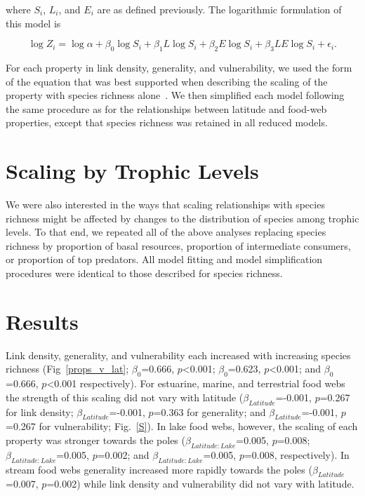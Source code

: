 \documentclass[12pt]{article}
\begin{document}
\begin{spacing}{1.0}
    \noindent where $S_{i}$, $L_{i}$, and $E_{i}$ are as defined previously. The logarithmic formulation of this model is

    \begin{equation}
    \label{LogLat}
    \log{Z_{i}} = \log{\alpha}+\beta_{0}\log{S_{i}} + \beta_{1}L\log{S_{i}} +\beta_{2}E\log{S_{i}} +\beta_{3}LE\log{S_{i}} +\epsilon_{i} .
    \end{equation}

    For each property in link density, generality, and vulnerability, we used the form of the equation that was best supported
    when describing the scaling of the property with species richness alone~\citep{Xiao2011}.
    We then simplified each model following the same procedure as for the relationships between
    latitude and food-web properties, except that species richness was retained in all reduced models. 


  \section*{Scaling by Trophic Levels}

    We were also interested in the ways that scaling relationships with species richness might
    be affected by changes to the distribution of species among trophic levels. To
    that end, we repeated all of the above analyses replacing species richness by
    proportion of basal resources, proportion of intermediate consumers,
    or proportion of top predators. All model fitting and model
    simplification procedures were identical to those described for species
    richness.


\section*{Results}

  Link density, generality, and vulnerability each increased with increasing
  species richness (Fig~\ref{props_v_lat}; $\beta_0$=0.666,
  $p$\textless0.001; $\beta_0$=0.623, $p$\textless0.001; and
  $\beta_0$=0.666, $p$\textless0.001 respectively).  For estuarine, marine,
  and terrestrial food webs the strength of this scaling did not vary with
  latitude ($\beta_{Latitude}$=-0.001, $p$=0.267 for link density;
  $\beta_{Latitude}$=-0.001, $p$=0.363 for generality; and
  $\beta_{Latitude}$=-0.001, $p$=0.267 for vulnerability; Fig.~\ref{S}). In
  lake food webs, however, the scaling of each property was stronger towards
  the poles ($\beta_{Latitude:Lake}$=0.005, $p$=0.008;
  $\beta_{Latitude:Lake}$=0.005, $p$=0.002; and
  $\beta_{Latitude:Lake}$=0.005, $p$=0.008, respectively). In stream food
  webs generality increased more rapidly towards the poles
  ($\beta_{Latitude}$=0.007, $p$=0.002) while link density and vulnerability
  did not vary with latitude.



\end{spacing}
\end{document}
